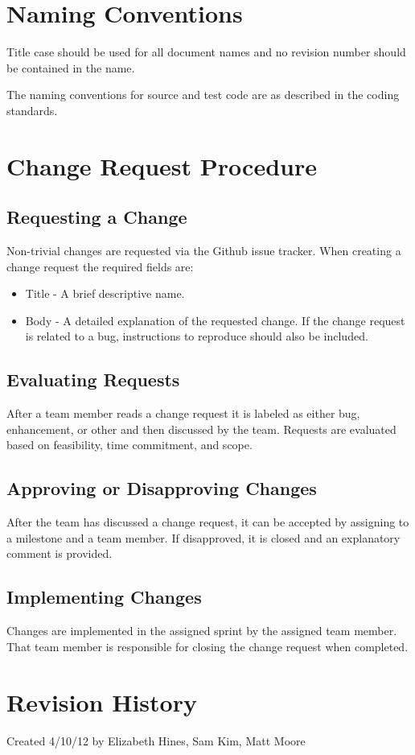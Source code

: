 \documentclass[12pt]{article}
\begin{document}
\section{Naming Conventions}
Title case should be used for all document names and no revision number should be contained in the name.

The naming conventions for source and test code are as described in the coding standards.

\section{Change Request Procedure}
\subsection{Requesting a Change}
Non-trivial changes are requested via the Github issue tracker. When creating a change request the required fields are:
\begin{itemize}
\item Title - A brief descriptive name.
\item Body - A detailed explanation of the requested change. If the change request is related to a bug, instructions to reproduce should also be included.
\end{itemize}

\subsection{Evaluating Requests}
After a team member reads a change request it is labeled as either bug, enhancement, or other and then discussed by the team. Requests are evaluated based on feasibility, time commitment, and scope.

\subsection{Approving or Disapproving Changes}
After the team has discussed a change request, it can be accepted by assigning to a milestone and a team member. If disapproved, it is closed and an explanatory comment is provided.

\subsection{Implementing Changes}
Changes are implemented in the assigned sprint by the assigned team member. That team member is responsible for closing the change request when completed.




\newpage
\section{Revision History}
Created 4/10/12 by Elizabeth Hines, Sam Kim, Matt Moore
\end{document}
